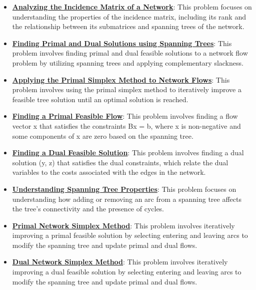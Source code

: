 \documentclass{article}%
\begin{document}
\begin{itemize}[leftmargin=*]
\item \href{https://www.math.purdue.edu/~yipn/421/2024-11-05-NetFlows.pdf#page=5}{\textbf{Analyzing the Incidence Matrix of a Network}}: This problem focuses on understanding the properties of the incidence matrix, including its rank and the relationship between its submatrices and spanning trees of the network. %
\item \href{https://www.math.purdue.edu/~yipn/421/2024-11-05-NetFlows.pdf#page=10}{\textbf{Finding Primal and Dual Solutions using Spanning Trees}}: This problem involves finding primal and dual feasible solutions to a network flow problem by utilizing spanning trees and applying complementary slackness. %
\item \href{https://www.math.purdue.edu/~yipn/421/2024-11-05-NetFlows.pdf#page=22}{\textbf{Applying the Primal Simplex Method to Network Flows}}: This problem involves using the primal simplex method to iteratively improve a feasible tree solution until an optimal solution is reached. %
\item \href{https://www.math.purdue.edu/~yipn/421/2024-11-07-NetSimplex.pdf#page=2}{\textbf{Finding a Primal Feasible Flow}}: This problem involves finding a flow vector x that satisfies the constraints Bx = b, where x is non-negative and some components of x are zero based on the spanning tree. %
\item \href{https://www.math.purdue.edu/~yipn/421/2024-11-07-NetSimplex.pdf#page=3}{\textbf{Finding a Dual Feasible Solution}}: This problem involves finding a dual solution (y, z) that satisfies the dual constraints, which relate the dual variables to the costs associated with the edges in the network. %
\item \href{https://www.math.purdue.edu/~yipn/421/2024-11-07-NetSimplex.pdf#page=4}{\textbf{Understanding Spanning Tree Properties}}: This problem focuses on understanding how adding or removing an arc from a spanning tree affects the tree's connectivity and the presence of cycles. %
\item \href{https://www.math.purdue.edu/~yipn/421/2024-11-07-NetSimplex.pdf#page=5}{\textbf{Primal Network Simplex Method}}: This problem involves iteratively improving a primal feasible solution by selecting entering and leaving arcs to modify the spanning tree and update primal and dual flows. %
\item \href{https://www.math.purdue.edu/~yipn/421/2024-11-07-NetSimplex.pdf#page=32}{\textbf{Dual Network Simplex Method}}: This problem involves iteratively improving a dual feasible solution by selecting entering and leaving arcs to modify the spanning tree and update primal and dual flows. %

\end{itemize}
\end{document}
